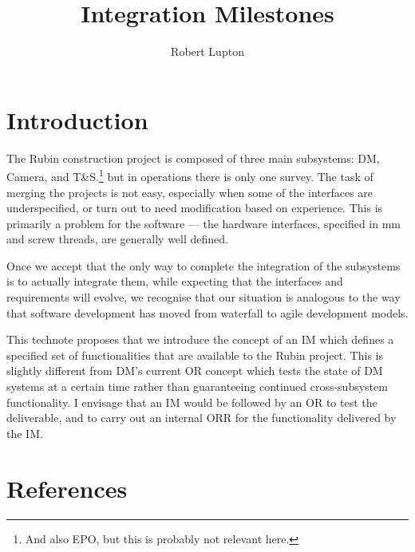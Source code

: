 \documentclass[SE,authoryear,toc]{lsstdoc}
\title{Integration Milestones}
\author{%
Robert Lupton
}
\date{\vcsDate}
\begin{document}
\maketitle

\section{Introduction}

The Rubin construction project is composed of three main subsystems: DM, Camera, and T\&S.\footnote{
  And also EPO, but this is probably not relevant here.}
but in operations there is only one survey.  The task of merging the projects is not easy, especially
when some of the interfaces are underspecified, or turn out to need modification based on experience.
This is primarily
a problem for the software --- the hardware interfaces, specified in mm and screw threads, are generally
well defined.

Once we accept that the only way to complete the integration of the subsystems is to actually integrate them,
while expecting that the interfaces and requirements will evolve, we recognise that our
situation is analogous to the
way that software development has moved from waterfall to agile development models.

This technote proposes that we introduce the concept of an \gls{IM} which defines
a specified set of functionalities that are available to the Rubin project.
This is slightly different from \gls{DM}'s
current \gls{OR} concept which tests the state of DM systems at a certain time rather than guaranteeing
continued cross-subsystem functionality.  I envisage that an \gls{IM} would be followed by an \gls{OR} to test
the deliverable, and to carry out an internal \gls{ORR} for the functionality delivered by the \gls{IM}.

\newcommand{\inputIM}[1]{\vfil\eject}
\inputIM{IMa}
\inputIM{IMb}
\inputIM{IMc}
\inputIM{IMd}
\inputIM{IMe}
\inputIM{IMf}
\inputIM{IMg}
\inputIM{IMh}
\inputIM{IMi}
\inputIM{IMj}
\inputIM{IMk}
\inputIM{IMbacklog}

\appendix
\section{References} \label{sec:bib}
\renewcommand{\refname}{} %


%
\printglossaries
\end{document}
